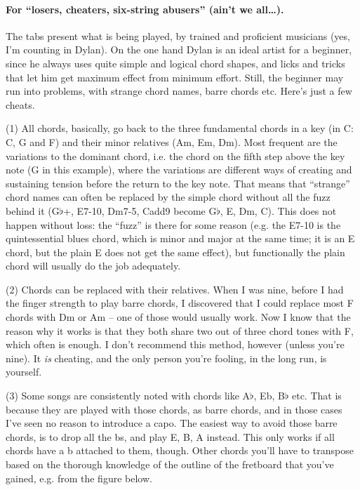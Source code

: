 \begin{articlelayout}
\paragraph{For ``losers, cheaters, six-string abusers'' (ain't we
all\ldots).}  The tabs present what is being played, by trained and
proficient musicians (yes, I'm counting in Dylan). On the one hand
Dylan is an ideal artist for a beginner, since he always uses quite
simple and logical chord shapes, and licks and tricks that let him get
maximum effect from minimum effort. Still, the beginner may run into
problems, with strange chord names, barre chords etc. Here's just a
few cheats.

(1) All chords, basically, go back to the three fundamental chords in
a key (in C: C, G and F) and their minor relatives (Am, Em, Dm). Most
frequent are the variations to the dominant chord, i.e. the chord on
the fifth step above the key note (G in this example), where the
variations are different ways of creating and sustaining tension
before the return to the key note. That means that ``{}strange''{}
chord names can often be replaced by the simple chord without all the
fuzz behind it (G$\flat$+, E7-10, Dm7-5, Cadd9 become G$\flat$, E, Dm,
C). This does not happen without loss: the ``{}fuzz''{} is there for
some reason (e.g. the E7-10 is the quintessential blues chord, which
is minor and major at the same time; it is an E chord, but the plain E
does not get the same effect), but functionally the plain chord will
usually do the job adequately.

(2) Chords can be replaced with their relatives. When I was nine,
before I had the finger strength to play barre chords, I discovered
that I could replace most F chords with Dm or Am -- one of those would
usually work. Now I know that the reason why it works is that they
both share two out of three chord tones with F, which often is
enough. I don't recommend this method, however (unless you're
nine). It \emph{is} cheating, and the only person you're fooling, in
the long run, is yourself.

(3) Some songs are consistently noted with chords like A$\flat$, Eb,
B$\flat$ etc. That is because they are played with those chords, as
barre chords, and in those cases I've seen no reason to introduce a
capo. The easiest way to avoid those barre chords, is to drop all the
bs, and play E, B, A instead. This only works if all chords have a b
attached to them, though. Other chords you'll have to transpose based
on the thorough knowledge of the outline of the fretboard that you've
gained, e.g. from the figure below.


\end{articlelayout}

